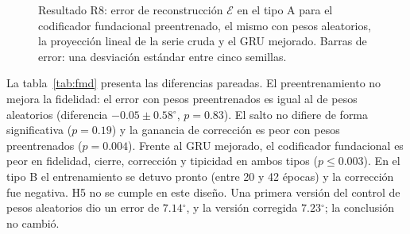 \documentclass[11pt,a4paper]{article}
\newcommand{\gr}{$^{\circ}$}
\begin{document}
\begin{figure}[h]
\centering
{}
\caption{Resultado R8: error de reconstrucción $\mathcal E$ en el tipo A para el codificador fundacional preentrenado, el mismo con pesos aleatorios, la proyección lineal de la serie cruda y el GRU mejorado. Barras de error: una desviación estándar entre cinco semillas.}
\label{fig:fm}
\end{figure}

La tabla~\ref{tab:fmd} presenta las diferencias pareadas. El preentrenamiento no mejora la fidelidad: el error con pesos preentrenados es igual al de pesos aleatorios (diferencia $-0.05\pm0.58$\gr, $p=0.83$). El salto no difiere de forma significativa ($p=0.19$) y la ganancia de corrección es peor con pesos preentrenados ($p=0.004$). Frente al GRU mejorado, el codificador fundacional es peor en fidelidad, cierre, corrección y tipicidad en ambos tipos ($p\le0.003$). En el tipo B el entrenamiento se detuvo pronto (entre 20 y 42 épocas) y la corrección fue negativa. H5 no se cumple en este diseño. Una primera versión del control de pesos aleatorios dio un error de $7.14$\gr{}, y la versión corregida $7.23$\gr; la conclusión no cambió.
\end{document}
